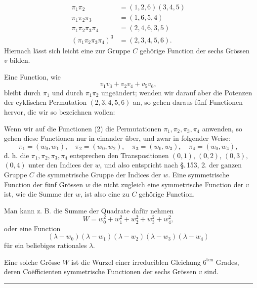 \[
\begin{aligned}
\pi_1 \pi_2 &= (1, 2, 6) (3, 4, 5) \\
\pi_1 \pi_2 \pi_3 &= (1, 6, 5, 4) \\
\pi_1 \pi_2 \pi_3 \pi_4 &= (2, 4, 6, 3, 5) \\
(\pi_1 \pi_2 \pi_3 \pi_4)^3 &= (2, 3, 4, 5, 6).
\end{aligned}
\]
Hiernach lässt sich leicht eine zur Gruppe $C$ gehörige Function der sechs Grössen $v$ bilden.

Eine Function, wie
\[
v_1 v_3 + v_2 v_4 + v_5 v_6,
\]
bleibt durch $\pi_1$ und durch $\pi_1 \pi_2$ ungeändert; wenden wir darauf aber die Potenzen der cyklischen Permutation $(2, 3, 4, 5, 6)$ an, so gehen daraus fünf Functionen hervor, die wir so bezeichnen wollen:

Wenn wir auf die Functionen (2) die Permutationen $\pi_1, \pi_2, \pi_3, \pi_4$ anwenden, so gehen diese Functionen nur in einander über, und zwar in folgender Weise:
\[
\pi_1 = (w_0, w_1), \quad \pi_2 = (w_0, w_2), \quad \pi_3 = (w_0, w_3), \quad \pi_4 = (w_0, w_4),
\]
d. h. die $\pi_1, \pi_2, \pi_3, \pi_4$ entsprechen den Transpositionen $(0, 1)$, $(0, 2)$, $(0, 3)$, $(0, 4)$ unter den Indices der $w$, und also entspricht nach \S.\,153, 2. der ganzen Gruppe $C$ die symmetrische Gruppe der Indices der $w$. Eine symmetrische Function der fünf Grössen $w$ die nicht zugleich eine symmetrische Function der $v$ ist, wie die Summe der $w$, ist also eine zu $C$ gehörige Function.

Man kann z. B. die Summe der Quadrate dafür nehmen
\[
W = w_0^2 + w_1^2 + w_2^2 + w_3^2 + w_4^2,
\]
oder eine Function
\[
(\lambda - w_0) (\lambda - w_1) (\lambda - w_2) (\lambda - w_3) (\lambda - w_4)
\]
für ein beliebiges rationales $\lambda$.

Eine solche Grösse $W$ ist die Wurzel einer irreduciblen Gleichung $6^{\mathrm{ten}}$ Grades, deren Coëfficienten symmetrische Functionen der sechs Grössen $v$ sind.

\begin{center}
\rule{3cm}{0.4pt}
\end{center}
